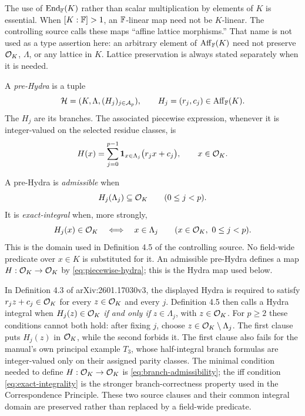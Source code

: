 The use of $\operatorname{End}_\mathbb F(K)$ rather than scalar multiplication by elements of $K$
is essential.  When $[K:\mathbb F]>1$, an $\mathbb F$-linear map need not be $K$-linear.
The controlling source calls these maps ``affine lattice morphisms.''  That
name is not used as a type assertion here: an arbitrary element of
$\operatorname{Aff}_\mathbb F(K)$ need not preserve $\mathcal O_K$, $\Lambda$, or any lattice in $K$.
Lattice preservation is always stated separately when it is needed.

\begin{definition}
A \emph{pre-Hydra} is a tuple
\[
 \mathcal H=(K,\Lambda,(H_j)_{j\in\mathcal A_p}),
 \qquad H_j=(r_j,c_j)\in\operatorname{Aff}_\mathbb F(K).
\]
The $H_j$ are its branches.  The associated piecewise expression, whenever
it is integer-valued on the selected residue classes, is
\begin{equation}
\label{eq:piecewise-hydra}
 H(x)=\sum_{j=0}^{p-1}\mathbf 1_{x\in\Lambda_j}\bigl(r_jx+c_j\bigr),
 \qquad x\in\mathcal O_K.
\end{equation}
\end{definition}

\begin{definition}
A pre-Hydra is \emph{admissible} when
\begin{equation}
\label{eq:branch-admissibility}
 H_j(\Lambda_j)\subseteq\mathcal O_K
 \qquad(0\leq j<p).
\end{equation}
It is \emph{exact-integral} when, more strongly,
\begin{equation}
\label{eq:exact-integrality}
 H_j(x)\in\mathcal O_K\quad\Longleftrightarrow\quad x\in\Lambda_j
 \qquad(x\in\mathcal O_K,\ 0\leq j<p).
\end{equation}
This is the domain used in Definition 4.5 of the controlling source.  No
field-wide predicate over $x\in K$ is substituted for it.  An admissible
pre-Hydra defines a map $H:\mathcal O_K\to\mathcal O_K$ by
\cref{eq:piecewise-hydra}; this is the Hydra map used below.
\end{definition}

\begin{sourceissue}
In Definition 4.3 of arXiv:2601.17030v3, the displayed Hydra is required to
satisfy $r_jz+c_j\in\mathcal O_K$ for every $z\in\mathcal O_K$ and every $j$.  Definition 4.5
then calls a Hydra integral when $H_j(z)\in\mathcal O_K$ \emph{if and only if}
$z\in\Lambda_j$, with $z\in\mathcal O_K$.  For $p\geq2$ these conditions cannot both
hold: after fixing $j$, choose $z\in\mathcal O_K\setminus\Lambda_j$.  The first clause
puts $H_j(z)$ in $\mathcal O_K$, while the second forbids it.  The first clause also
fails for the manual's own principal example $T_3$, whose half-integral
branch formulas are integer-valued only on their assigned parity classes.
The minimal condition needed to define $H:\mathcal O_K\to\mathcal O_K$ is
\cref{eq:branch-admissibility}; the iff condition
\cref{eq:exact-integrality} is the stronger branch-correctness property used
in the Correspondence Principle.  These two source clauses and their common
integral domain are preserved rather than replaced by a field-wide
predicate.
\end{sourceissue}

